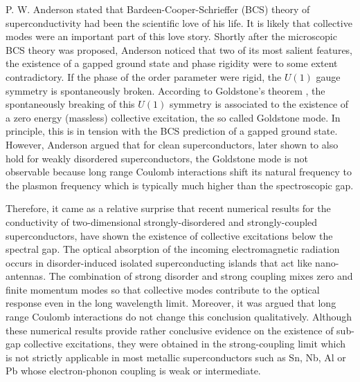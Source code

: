 \documentclass[Collective.tex]{revtex4-1}
\begin{document}
P. W. Anderson stated  \cite{cooper2010} that Bardeen-Cooper-Schrieffer (BCS) theory of superconductivity \cite{Bardeen1957} had been the scientific love of his life. It is likely that collective modes were an important part of this love story. Shortly after the microscopic BCS theory \cite{Bardeen1957} was proposed, Anderson \cite{anderson1958sc,anderson1963} noticed that two of its most salient features, the existence of a gapped ground state and phase rigidity were to some extent contradictory. If the phase of the order parameter were rigid, the $U(1)$ gauge symmetry is spontaneously broken.
%
According to Goldstone's theorem \cite{nambu1960,goldstone1961}, the spontaneously breaking of this $U(1)$ symmetry 
is associated to the existence of a zero energy (massless) collective excitation, the so called Goldstone mode. In principle, this is in tension with the BCS prediction of a gapped ground state.  
%
However, Anderson argued \cite{anderson1958sc} that for clean superconductors, later \cite{belitz1989} shown to also hold for weakly disordered superconductors,  the Goldstone mode is not observable because long range Coulomb interactions shift its natural frequency to the plasmon frequency which is typically much higher than the spectroscopic gap. 

%
Therefore, it came as a relative surprise that recent numerical results for the conductivity of two-dimensional strongly-disordered and strongly-coupled superconductors,\cite{cea2014,cea2015,Seibold2015,barabash2003,sherman2015,swanson2014,seibold2017,abhisek2020} have shown the existence of collective excitations below the spectral gap. The optical absorption of the incoming electromagnetic radiation occurs \cite{cea2014} in disorder-induced isolated superconducting islands that act like nano-antennas. 
The combination of strong disorder and strong coupling mixes zero and finite momentum modes so that collective modes contribute to the optical response even in the long wavelength limit. 
Moreover, it was argued \cite{cea2014,belitz1989} that long range Coulomb interactions do not change this conclusion qualitatively. 
%
Although these \cite{cea2014} numerical results provide rather conclusive evidence on the existence of sub-gap collective excitations, they were obtained in the strong-coupling limit which is not strictly applicable in most metallic superconductors such as Sn, Nb, Al or Pb whose electron-phonon coupling is weak or intermediate.  
\end{document}
